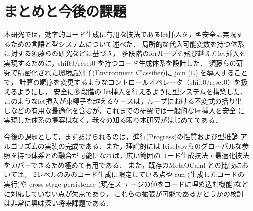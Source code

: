 \chapter{まとめと今後の課題}
本研究では，効率的コード生成に有用な技法であるlet挿入を，型安全に実現す
るための言語と型システムについて述べた．
局所的な代入可能変数を持つ体系に対する須藤らの研究\cite{Sudo2014}などに基づき，
多段階のforループを飛び越えたlet挿入を実現するために，shift0/reset0 を持つコード生成体系を設計した．
須藤らの研究で精密化された環境識別子(Environment Classifier)に join ($\cup$) を導入することで，
計算の順序を変更するようなコントロールオペレータ（shift0/reset0）を扱えるようにし，
安全に多段階の let挿入を行えるように型システムを構築した．
このようなlet挿入が束縛子を越えるケースは，ループにおける不変式の括り出
しなどの有用な最適化を含むが，これまでの研究では一般的なlet挿入を安全
に実現した体系の提案はなく，我々の知る限り本研究がはじめてである．

今後の課題として，まずあげられるのは，進行(Progress)の性質および型推論
アルゴリズムの実装の完成である．また，理論的には Kiselyovらのグローバルな参
照を持つ体系との融合が可能になれば，広い範囲のコード生成技法・最適化技法
をカバーできるため極めて有用である．
また，既存のMetaOCaml との比較においては，
2レベルのみのコード生成に限定している点や
run (生成したコードの実行)や cross-stage persistence (現在ス
テージの値をコードに埋め込む機能)などに対応していない点が欠点であり，
これらの拡張が可能であるかどうかの検討は非常に興味深い将来課題である．

